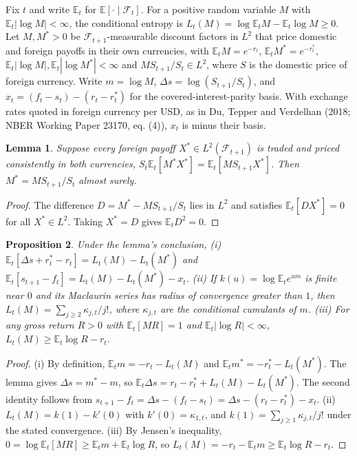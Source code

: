 \documentclass[11pt]{article}
\newtheorem{proposition}{Proposition}
\newtheorem{lemma}[proposition]{Lemma}
\theoremstyle{remark}
\newcommand{\E}{\mathbb{E}}
\begin{document}
Fix $t$ and write $\E_t$ for $\E[\cdot\mid\mathcal F_t]$. For a positive random variable $M$ with $\E_t|\log M|<\infty$, the conditional entropy is $L_t(M)=\log\E_tM-\E_t\log M\ge0$. Let $M,M^*>0$ be $\mathcal F_{t+1}$-measurable discount factors in $L^2$ that price domestic and foreign payoffs in their own currencies, with $\E_tM=e^{-r_t}$, $\E_tM^*=e^{-r^*_t}$, $\E_t|\log M|,\E_t|\log M^*|<\infty$ and $MS_{t+1}/S_t\in L^2$, where $S$ is the domestic price of foreign currency. Write $m=\log M$, $\Delta s=\log(S_{t+1}/S_t)$, and $x_t=(f_t-s_t)-(r_t-r^*_t)$ for the covered-interest-parity basis. With exchange rates quoted in foreign currency per USD, as in Du, Tepper and Verdelhan (2018; NBER Working Paper 23170, eq. (4)), $x_t$ is minus their basis.

\begin{lemma}
Suppose every foreign payoff $X^*\in L^2(\mathcal F_{t+1})$ is traded and priced consistently in both currencies, $S_t\E_t[M^*X^*]=\E_t[MS_{t+1}X^*]$. Then $M^*=MS_{t+1}/S_t$ almost surely.
\end{lemma}

\begin{proof}
The difference $D=M^*-MS_{t+1}/S_t$ lies in $L^2$ and satisfies $\E_t[DX^*]=0$ for all $X^*\in L^2$. Taking $X^*=D$ gives $\E_tD^2=0$.
\end{proof}

\begin{proposition}
Under the lemma's conclusion, (i) $\E_t[\Delta s+r^*_t-r_t]=L_t(M)-L_t(M^*)$ and $\E_t[s_{t+1}-f_t]=L_t(M)-L_t(M^*)-x_t$. (ii) If $k(u)=\log\E_te^{um}$ is finite near $0$ and its Maclaurin series has radius of convergence greater than $1$, then $L_t(M)=\sum_{j\ge2}\kappa_{j,t}/j!$, where $\kappa_{j,t}$ are the conditional cumulants of $m$. (iii) For any gross return $R>0$ with $\E_t[MR]=1$ and $\E_t|\log R|<\infty$, $L_t(M)\ge\E_t\log R-r_t$.
\end{proposition}

\begin{proof}
(i) By definition, $\E_tm=-r_t-L_t(M)$ and $\E_tm^*=-r^*_t-L_t(M^*)$. The lemma gives $\Delta s=m^*-m$, so $\E_t\Delta s=r_t-r^*_t+L_t(M)-L_t(M^*)$. The second identity follows from $s_{t+1}-f_t=\Delta s-(f_t-s_t)=\Delta s-(r_t-r^*_t)-x_t$. (ii) $L_t(M)=k(1)-k'(0)$ with $k'(0)=\kappa_{1,t}$, and $k(1)=\sum_{j\ge1}\kappa_{j,t}/j!$ under the stated convergence. (iii) By Jensen's inequality, $0=\log\E_t[MR]\ge\E_tm+\E_t\log R$, so $L_t(M)=-r_t-\E_tm\ge\E_t\log R-r_t$.
\end{proof}
\end{document}
